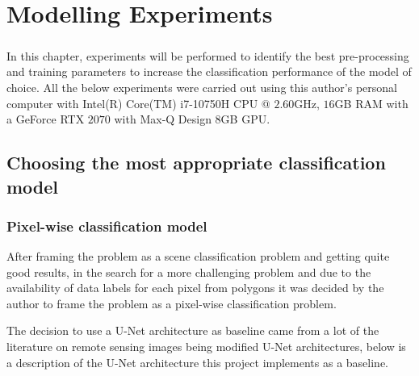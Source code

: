 \chapter{ Modelling Experiments} \label{experiments_chapter}
\paragraph{}
In this chapter, experiments will be performed to identify the best pre-processing and training parameters to increase the classification performance of the model of choice. 
All the below experiments were carried out using this author's personal computer with Intel(R) Core(TM) i7-10750H \gls{CPU} @ $2.60$GHz, $16$GB \gls{RAM} with a GeForce RTX $2070$ with Max-Q Design $8$GB \gls{GPU}.
\section{Choosing the most appropriate classification model} \label{classification_models}
\subsection{Pixel-wise classification model} \label{pixel_model}
After framing the problem as a scene classification problem and getting quite good results, in the search for a more challenging problem and due to the availability of data labels for each pixel from polygons it was decided by the author to frame the problem as a pixel-wise classification problem.

The decision to use a U-Net architecture as baseline came from a lot of the literature on remote sensing images being modified U-Net architectures, below is a description of the U-Net architecture this project implements as a baseline.
